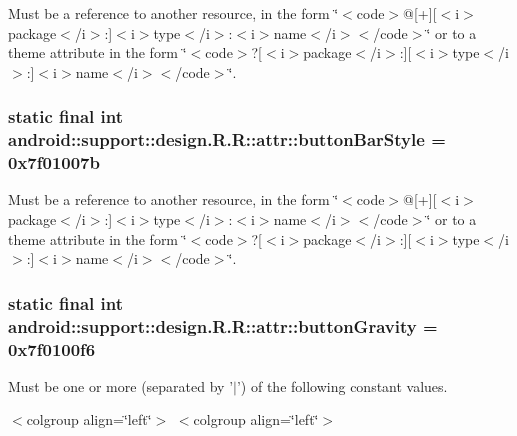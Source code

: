 Must be a reference to another resource, in the form \char`\"{}$<$code$>$@\mbox{[}+\mbox{]}\mbox{[}$<$i$>$package$<$/i$>$:\mbox{]}$<$i$>$type$<$/i$>$:$<$i$>$name$<$/i$>$$<$/code$>$\char`\"{} or to a theme attribute in the form \char`\"{}$<$code$>$?\mbox{[}$<$i$>$package$<$/i$>$:\mbox{]}\mbox{[}$<$i$>$type$<$/i$>$:\mbox{]}$<$i$>$name$<$/i$>$$<$/code$>$\char`\"{}. \hypertarget{classandroid_1_1support_1_1design_1_1_r_1_1attr_68189cb11076ec525da6840db10cf9a0}{
\subsubsection[{buttonBarStyle}]{\setlength{\rightskip}{0pt plus 5cm}static final int android::support::design.R.R::attr::buttonBarStyle = 0x7f01007b}}
\label{classandroid_1_1support_1_1design_1_1_r_1_1attr_68189cb11076ec525da6840db10cf9a0}


Must be a reference to another resource, in the form \char`\"{}$<$code$>$@\mbox{[}+\mbox{]}\mbox{[}$<$i$>$package$<$/i$>$:\mbox{]}$<$i$>$type$<$/i$>$:$<$i$>$name$<$/i$>$$<$/code$>$\char`\"{} or to a theme attribute in the form \char`\"{}$<$code$>$?\mbox{[}$<$i$>$package$<$/i$>$:\mbox{]}\mbox{[}$<$i$>$type$<$/i$>$:\mbox{]}$<$i$>$name$<$/i$>$$<$/code$>$\char`\"{}. \hypertarget{classandroid_1_1support_1_1design_1_1_r_1_1attr_4e7160447080c17ef787d69721a29dfa}{
\subsubsection[{buttonGravity}]{\setlength{\rightskip}{0pt plus 5cm}static final int android::support::design.R.R::attr::buttonGravity = 0x7f0100f6}}
\label{classandroid_1_1support_1_1design_1_1_r_1_1attr_4e7160447080c17ef787d69721a29dfa}


Must be one or more (separated by '$|$') of the following constant values. \begin{TabularC}{0}
\hline
\end{TabularC}
$<$colgroup align=\char`\"{}left\char`\"{}$>$ $<$colgroup align=\char`\"{}left\char`\"{}$>$ 

